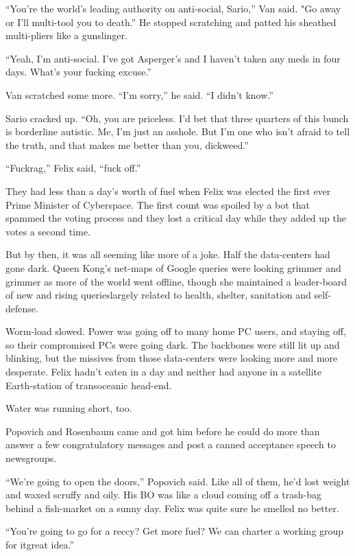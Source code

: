 “You’re the world’s leading authority on anti-social, Sario,” Van
said. "Go away or I’ll multi-tool you to death.” He stopped
scratching and patted his sheathed multi-pliers like a gunslinger.

“Yeah, I’m anti-social. I’ve got Asperger’s and I haven’t taken any
meds in four days. What’s your fucking excuse.”

Van scratched some more. “I’m sorry,” he said. “I didn’t know.”

Sario cracked up. “Oh, you are priceless. I’d bet that three
quarters of this bunch is borderline autistic. Me, I’m just an
asshole. But I’m one who isn’t afraid to tell the truth, and that
makes me better than you, dickweed.”

“Fuckrag,” Felix said, “fuck off.”

\tb

They had less than a day’s worth of fuel when Felix was elected the
first ever Prime Minister of Cyberspace. The first count was
spoiled by a bot that spammed the voting process and they lost a
critical day while they added up the votes a second time.

But by then, it was all seeming like more of a joke. Half the
data-centers had gone dark. Queen Kong’s net-maps of Google queries
were looking grimmer and grimmer as more of the world went offline,
though she maintained a leader-board of new and rising
queries\dash{}largely related to health, shelter, sanitation and
self-defense.

Worm-load slowed. Power was going off to many home PC users, and
staying off, so their compromised PCs were going dark. The
backbones were still lit up and blinking, but the missives from
those data-centers were looking more and more desperate. Felix
hadn’t eaten in a day and neither had anyone in a satellite
Earth-station of transoceanic head-end.

Water was running short, too.

Popovich and Rosenbaum came and got him before he could do more
than answer a few congratulatory messages and post a canned
acceptance speech to newsgroups.

“We’re going to open the doors,” Popovich said. Like all of them,
he’d lost weight and waxed scruffy and oily. His BO was like a
cloud coming off a trash-bag behind a fish-market on a sunny day.
Felix was quite sure he smelled no better.

“You’re going to go for a reccy? Get more fuel? We can charter a
working group for it\dash{}great idea.”


